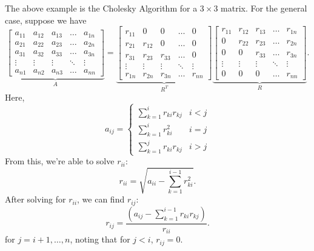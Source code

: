 \documentclass[letterpaper]{article}
\newcommand{\0}{\mathbf{0}}
\begin{document}
The above example is the Cholesky Algorithm for a $3 \times 3$ matrix. For the general case, suppose we have 
\[\underbrace{\begin{bmatrix}
    a_{11} & a_{12} & a_{13} & \hdots & a_{1n} \\ 
    a_{21} & a_{22} & a_{23} & \hdots & a_{2n} \\ 
    a_{31} & a_{32} & a_{33} & \hdots & a_{3n} \\ 
    \vdots & \vdots & \vdots & \ddots & \vdots \\ 
    a_{n1} & a_{n2} & a_{n3} & \hdots & a_{nn}
\end{bmatrix}}_{A} = \underbrace{\begin{bmatrix}
    r_{11} & 0 & 0 & \hdots & 0 \\ 
    r_{21} & r_{12} & 0 & \hdots & 0 \\ 
    r_{31} & r_{23} & r_{33} & \hdots & 0 \\ 
    \vdots & \vdots & \vdots & \ddots & \vdots \\ 
    r_{1n} & r_{2n} & r_{3n} & \hdots & r_{nn}
\end{bmatrix}}_{R^T} \underbrace{\begin{bmatrix} 
    r_{11} & r_{12} & r_{13} & \hdots & r_{1n} \\ 
    0 & r_{22} & r_{23} & \hdots & r_{2n} \\ 
    0 & 0 & r_{33} & \hdots & r_{3n} \\ 
    \vdots & \vdots & \vdots & \ddots & \vdots \\ 
    0 & 0 & 0 & \hdots & r_{nn}
\end{bmatrix}}_{R}.\]
Here, 
\begin{equation}
    a_{ij} = \begin{cases}
        \sum_{k = 1}^{i} r_{ki} r_{kj} & i < j \\ 
        \sum_{k = 1}^{i} r_{ki}^2 & i = j \\ 
        \sum_{k = 1}^{j} r_{ki} r_{kj} & i > j
    \end{cases}
\end{equation}
From this, we're able to solve $r_{ii}$: 
\begin{equation}
    r_{ii} = \sqrt{a_{ii} - \sum_{k = 1}^{i - 1} r_{ki}^2}.
\end{equation}
After solving for $r_{ii}$, we can find $r_{ij}$:
\begin{equation}
    r_{ij} = \frac{\left(a_{ij} - \sum_{k = 1}^{i - 1} r_{ki} r_{kj}\right)}{r_{ii}}.
\end{equation}
for $j = i + 1, \hdots, n$, noting that for $j < i$, $r_{ij} = 0$. 
\end{document}
